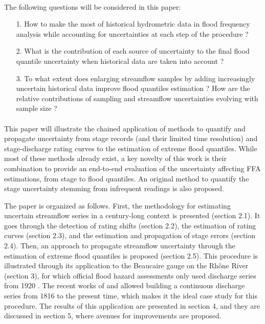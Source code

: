 \documentclass[11pt]{article}
\begin{document}
    \paragraph{}
    The following questions will be considered in this paper: 
    \begin{itemize}
        \item[1.] How to make the most of historical hydrometric data in flood frequency analysis while accounting for uncertainties at each step of the procedure ? 
        
        \item[2.] What is the contribution of each source of uncertainty to the final flood quantile uncertainty when historical data are taken into account ? 
        
        \item[3.] To what extent does enlarging streamflow samples by adding increasingly uncertain historical data improve flood quantiles estimation ? How are the relative contributions of sampling and streamflow uncertainties evolving with sample size ?
    \end{itemize}

    \paragraph{}
    This paper will illustrate the chained application of methods to quantify and propagate uncertainty from stage records (and their limited time resolution) and stage-discharge rating curves to the estimation of extreme flood quantiles. While most of these methods already exist, a key novelty of this work is their combination to provide an end-to-end evaluation of the  uncertainty affecting FFA estimations, from stage to flood quantiles. An original method to quantify the stage uncertainty stemming from infrequent readings is also proposed.

    The paper is organized as follows. First, the methodology for estimating uncertain streamflow series in a century-long context is presented (section 2.1). It goes through the detection of rating shifts (section 2.2), the estimation of rating curves (section 2.3), and the estimation and propagation of stage errors (section 2.4). Then, an approach to propagate streamflow uncertainty through the estimation of extreme flood quantiles is proposed (section 2.5). This procedure is illustrated through its application to the Beaucaire gauge on the Rhône River (section 3), for which official flood hazard assessments only used discharge series from 1920 \citep{rigaudiere_etude_2000}. The recent works of \citet{pichard_hydro-climatology_2017} and \citet{bard_actualisation_2018} allowed building a continuous discharge series from 1816 to the present time, which makes it the ideal case study for this procedure. The results of this application are presented in section 4, and they are discussed in section 5, where avenues for improvements are proposed.
\end{document}
